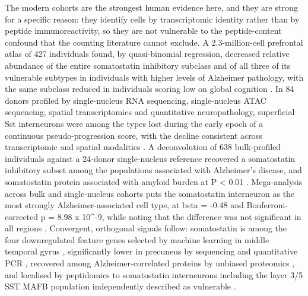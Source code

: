 \documentclass[11pt]{article}
\begin{document}
The modern cohorts are the strongest human evidence here, and they are strong for a specific reason: they identify cells by transcriptomic identity rather than by peptide immunoreactivity, so they are not vulnerable to the peptide-content confound that the counting literature cannot exclude. A 2.3-million-cell prefrontal atlas of 427 individuals found, by quasi-binomial regression, decreased relative abundance of the entire somatostatin inhibitory subclass and of all three of its vulnerable subtypes in individuals with higher levels of Alzheimer pathology, with the same subclass reduced in individuals scoring low on global cognition \citep{Mathys2023}. In 84 donors profiled by single-nucleus RNA sequencing, single-nucleus ATAC sequencing, spatial transcriptomics and quantitative neuropathology, superficial Sst interneurons were among the types lost during the early epoch of a continuous pseudo-progression score, with the decline consistent across transcriptomic and spatial modalities \citep{Gabitto2024}. A deconvolution of 638 bulk-profiled individuals against a 24-donor single-nucleus reference recovered a somatostatin inhibitory subset among the populations associated with Alzheimer's disease, and somatostatin protein associated with amyloid burden at P < 0.01 \citep{Cain2023}. Mega-analysis across bulk and single-nucleus cohorts puts the somatostatin interneuron as the most strongly Alzheimer-associated cell type, at beta = -0.48 and Bonferroni-corrected p = 8.98 x 10\textasciicircum{}-9, while noting that the difference was not significant in all regions \citep{Consens2022b}. Convergent, orthogonal signals follow: somatostatin is among the four downregulated feature genes selected by machine learning in middle temporal gyrus \citep{Wang2024}, significantly lower in precuneus by sequencing and quantitative PCR \citep{Guennewig2021}, recovered among Alzheimer-correlated proteins by unbiased proteomics \citep{Sathe2020}, and localised by peptidomics to somatostatin interneurons including the layer 3/5 SST MAFB population independently described as vulnerable \citep{Morgan2024a}.
\end{document}
